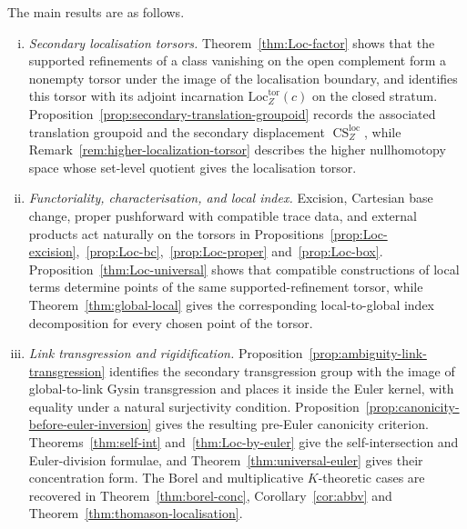 \documentclass[10pt,a4paper,dvipsnames,x11names]{amsart}
\newcommand{\Loc}{\mathrm{Loc}}
\newcommand{\CSLoc}{\operatorname{CS}^{\mathrm{loc}}}
\numberwithin{equation}{section}
\theoremstyle{plain}
\theoremstyle{definition}
\theoremstyle{remark}
\begin{document}
The main results are as follows.
\begin{enumerate}[(i)]
\item \emph{Secondary localisation torsors.} Theorem~\ref{thm:Loc-factor} shows that the supported refinements of a class vanishing on the open complement form a nonempty torsor under the image of the localisation boundary, and identifies this torsor with its adjoint incarnation $\Loc_Z^{\mathrm{tor}}(c)$ on the closed stratum. Proposition~\ref{prop:secondary-translation-groupoid} records the associated translation groupoid and the secondary displacement $\CSLoc_Z$, while Remark~\ref{rem:higher-localization-torsor} describes the higher nullhomotopy space whose set-level quotient gives the localisation torsor.

\item \emph{Functoriality, characterisation, and local index.} Excision, Cartesian base change, proper pushforward with compatible trace data, and external products act naturally on the torsors in Propositions~\ref{prop:Loc-excision},~\ref{prop:Loc-bc},~\ref{prop:Loc-proper} and~\ref{prop:Loc-box}. Proposition~\ref{thm:Loc-universal} shows that compatible constructions of local terms determine points of the same supported-refinement torsor, while Theorem~\ref{thm:global-local} gives the corresponding local-to-global index decomposition for every chosen point of the torsor.

\item \emph{Link transgression and rigidification.} Proposition~\ref{prop:ambiguity-link-transgression} identifies the secondary transgression group with the image of global-to-link Gysin transgression and places it inside the Euler kernel, with equality under a natural surjectivity condition. Proposition~\ref{prop:canonicity-before-euler-inversion} gives the resulting pre-Euler canonicity criterion. Theorems~\ref{thm:self-int} and~\ref{thm:Loc-by-euler} give the self-intersection and Euler-division formulae, and Theorem~\ref{thm:universal-euler} gives their concentration form. The Borel and multiplicative $K$-theoretic cases are recovered in Theorem~\ref{thm:borel-conc}, Corollary~\ref{cor:abbv} and Theorem~\ref{thm:thomason-localisation}.


\end{enumerate}
\end{document}
